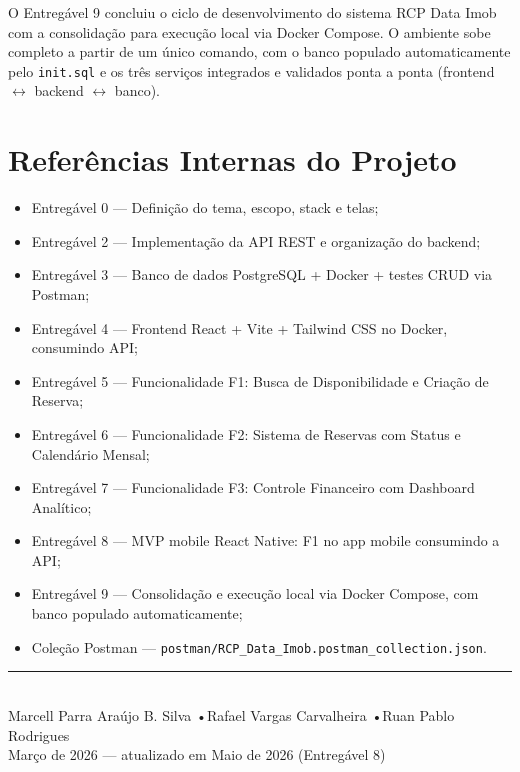 \documentclass[12pt, a4paper]{article}
\begin{document}
O Entregável 9 concluiu o ciclo de desenvolvimento do sistema RCP Data Imob com a consolidação
para execução local via Docker Compose. O ambiente sobe completo a partir de um único comando,
com o banco populado automaticamente pelo \texttt{init.sql} e os três serviços integrados e
validados ponta a ponta (frontend $\leftrightarrow$ backend $\leftrightarrow$ banco).
\section{Referências Internas do Projeto}

\begin{itemize}[leftmargin=1.5em]
  \item Entregável 0 — Definição do tema, escopo, stack e telas;
  \item Entregável 2 — Implementação da API REST e organização do backend;
  \item Entregável 3 — Banco de dados PostgreSQL + Docker + testes CRUD via Postman;
  \item Entregável 4 — Frontend React + Vite + Tailwind CSS no Docker, consumindo API;
  \item Entregável 5 — Funcionalidade F1: Busca de Disponibilidade e Criação de Reserva;
  \item Entregável 6 — Funcionalidade F2: Sistema de Reservas com Status e Calendário Mensal;
  \item Entregável 7 — Funcionalidade F3: Controle Financeiro com Dashboard Analítico;
  \item Entregável 8 — MVP mobile React Native: F1 no app mobile consumindo a API;
  \item Entregável 9 — Consolidação e execução local via Docker Compose, com banco populado automaticamente;
  \item Coleção Postman — \texttt{postman/RCP\_Data\_Imob.postman\_collection.json}.
\end{itemize}

\vspace{2cm}
\begin{center}
  \color{gray60}\rule{0.5\textwidth}{0.4pt}\\[8pt]
  {\small Marcell Parra Araújo B. Silva \quad•\quad Rafael Vargas Carvalheira \quad•\quad Ruan Pablo Rodrigues}\\[4pt]
  {\small\color{teal} Março de 2026 — atualizado em Maio de 2026 (Entregável 8)}
\end{center}
\end{document}
